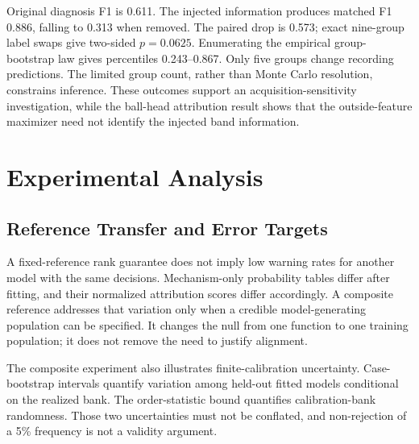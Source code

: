 \documentclass[conference]{IEEEtran}
\begin{document}
\begin{table}[t]
\centering
\caption{CWRU diameter-held-out interventional TreeSHAP audit. B, IR, and OR denote ball, inner-race, and outer-race faults. Original, resonance, and removed refer to original models/signals, confounded models with their label-assigned response, and those same confounded models after response removal. Band share sums the four broad-band features on own-location recordings. No calibrated mechanism-warning threshold is available.}
\label{tab:cwru-audit}
\footnotesize

\end{table}

Original diagnosis F1 is 0.611. The injected information produces matched F1 0.886, falling to 0.313 when removed. The paired drop is 0.573; exact nine-group label swaps give two-sided $p=0.0625$. Enumerating the empirical group-bootstrap law gives percentiles 0.243--0.867. Only five groups change recording predictions. The limited group count, rather than Monte Carlo resolution, constrains inference. These outcomes support an acquisition-sensitivity investigation, while the ball-head attribution result shows that the outside-feature maximizer need not identify the injected band information.

\section{Experimental Analysis}
\label{sec:analysis}
\subsection{Reference Transfer and Error Targets}
A fixed-reference rank guarantee does not imply low warning rates for another model with the same decisions. Mechanism-only probability tables differ after fitting, and their normalized attribution scores differ accordingly. A composite reference addresses that variation only when a credible model-generating population can be specified. It changes the null from one function to one training population; it does not remove the need to justify alignment.

The composite experiment also illustrates finite-calibration uncertainty. Case-bootstrap intervals quantify variation among held-out fitted models conditional on the realized bank. The order-statistic bound quantifies calibration-bank randomness. Those two uncertainties must not be conflated, and non-rejection of a 5\% frequency is not a validity argument.
\end{document}
